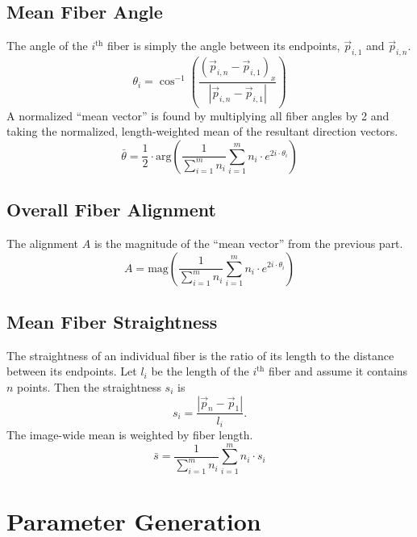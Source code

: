 \documentclass[12pt]{article}
\begin{document}
\subsection*{Mean Fiber Angle}

The angle of the $i^\text{th}$ fiber is simply the angle between its endpoints, $\vec{p}_{i,1}$ and $\vec{p}_{i,n}$.
\begin{equation*}
    \theta_i = \cos^{-1} \left(\frac{(\vec{p}_{i,n} - \vec{p}_{i,1})_x}{|\vec{p}_{i,n} - \vec{p}_{i,1}|}\right)
\end{equation*}
A normalized ``mean vector'' is found by multiplying all fiber angles by 2 and taking the normalized, length-weighted mean of the resultant direction vectors.
\begin{equation*}
    \bar{\theta} = \frac{1}{2} \cdot \text{arg} \left(
    \frac{1}{\sum_{i = 1}^m n_i} 
    \sum_{i = 1}^m n_i \cdot e^{2 i \cdot \theta_i} \right)
\end{equation*}


\subsection*{Overall Fiber Alignment}

The alignment $A$ is the magnitude of the ``mean vector'' from the previous part.
\begin{equation*}
    A = \text{mag} \left(
    \frac{1}{\sum_{i = 1}^m n_i} 
    \sum_{i = 1}^m n_i \cdot e^{2 i \cdot \theta_i} \right)
\end{equation*}


\subsection*{Mean Fiber Straightness}

The straightness of an individual fiber is the ratio of its length to the distance between its endpoints. Let $l_i$ be the length of the $i^\text{th}$ fiber and assume it contains $n$ points. Then the straightness $s_i$ is
\begin{equation*}
s_i = \frac{|\vec{p}_n - \vec{p}_1|}{l_i}.
\end{equation*}
The image-wide mean is weighted by fiber length.
\begin{equation*}
\bar{s} = 
    \frac{1}{\sum_{i = 1}^m n_i}
    \sum_{i = 1}^m n_i \cdot s_i
\end{equation*}


\section*{Parameter Generation}
\end{document}
